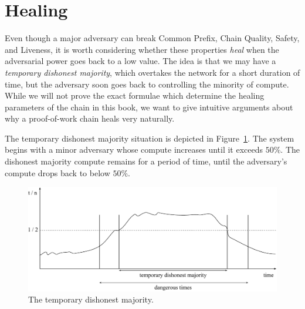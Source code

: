 \section{Healing}

Even though a major adversary can break Common Prefix, Chain Quality, Safety, and Liveness,
it is worth considering whether these properties \emph{heal} when the adversarial power
goes back to a low value. The idea is that we may have a \emph{temporary dishonest majority},
which overtakes the network for a short duration of time, but the adversary soon goes back
to controlling the minority of compute. While we will not prove the exact formulae which
determine the healing parameters of the chain in this book, we want to give intuitive
arguments about why a proof-of-work chain heals very naturally.

The temporary dishonest majority situation is depicted in Figure~\ref{fig.temporary-dishonest}.
The system begins with a minor adversary whose compute increases until it exceeds
$50\%$. The dishonest majority compute remains for a period of time, until the adversary's
compute drops back to below $50\%$.

\begin{figure}[h]
  \centering
  \includegraphics[width=\columnwidth,keepaspectratio]{figures/temporary-dishonest.pdf}
  \caption{The temporary dishonest majority.}
  \label{fig.temporary-dishonest}
\end{figure}

